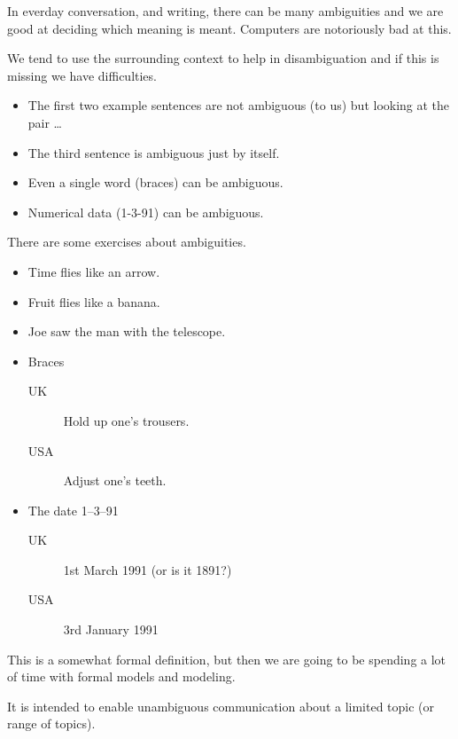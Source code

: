 \begin{remarks}
\remintro


    In everday conversation, and writing, there can be many ambiguities
and we are good at deciding which meaning is meant. Computers are
notoriously bad at this.

    We tend to use the surrounding context to help in disambiguation
and if this is missing we have difficulties.

\begin{itemize}
\item     The first two example sentences are not ambiguous (to us) but
looking at the pair \ldots

\item     The third sentence is ambiguous just by itself.

\item    Even a single word (braces) can be ambiguous.

\item     Numerical data (1-3-91) can be ambiguous.
\end{itemize}

    There are some exercises about ambiguities.

\remend
\end{remarks}


\begin{itemize}
\item Time flies like an arrow.
\item Fruit flies like a banana.
\item Joe saw the man with the telescope.
\item Braces
  \begin{description}
  \item[UK] Hold up one's trousers.
  \item[USA] Adjust one's teeth.
  \end{description}
\item The date 1--3--91
  \begin{description}
  \item[UK] 1st March 1991 (or is it 1891?)
  \item[USA] 3rd January 1991
  \end{description}
\end{itemize}

\begin{remarks}
\remintro


    This is a somewhat formal definition, but then we are going to
be spending a lot of time with formal models and modeling.

    It is intended to enable unambiguous communication about a limited
topic (or range of topics).

\remend
\end{remarks}

